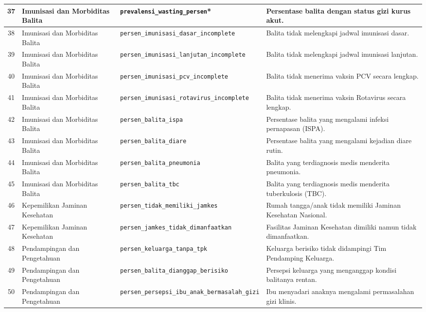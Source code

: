 \begin{longtable}{|c|p{}|p{}|p{}|}
    37 & Imunisasi dan Morbiditas Balita & \texttt{prevalensi\_\allowbreak wasting\_\allowbreak persen}* & Persentase balita dengan status gizi kurus akut. \tabularnewline \hline
    38 & Imunisasi dan Morbiditas Balita & \texttt{persen\_\allowbreak imunisasi\_\allowbreak dasar\_\allowbreak incomplete} & Balita tidak melengkapi jadwal imunisasi dasar. \tabularnewline \hline
    39 & Imunisasi dan Morbiditas Balita & \texttt{persen\_\allowbreak imunisasi\_\allowbreak lanjutan\_\allowbreak incomplete} & Balita tidak melengkapi jadwal imunisasi lanjutan. \tabularnewline \hline
    40 & Imunisasi dan Morbiditas Balita & \texttt{persen\_\allowbreak imunisasi\_\allowbreak pcv\_\allowbreak incomplete} & Balita tidak menerima vaksin PCV secara lengkap. \tabularnewline \hline
    41 & Imunisasi dan Morbiditas Balita & \texttt{persen\_\allowbreak imunisasi\_\allowbreak rotavirus\_\allowbreak incomplete} & Balita tidak menerima vaksin Rotavirus secara lengkap. \tabularnewline \hline
    42 & Imunisasi dan Morbiditas Balita & \texttt{persen\_\allowbreak balita\_\allowbreak ispa} & Persentase balita yang mengalami infeksi pernapasan (ISPA). \tabularnewline \hline
    43 & Imunisasi dan Morbiditas Balita & \texttt{persen\_\allowbreak balita\_\allowbreak diare} & Persentase balita yang mengalami kejadian diare rutin. \tabularnewline \hline
    44 & Imunisasi dan Morbiditas Balita & \texttt{persen\_\allowbreak balita\_\allowbreak pneumonia} & Balita yang terdiagnosis medis menderita pneumonia. \tabularnewline \hline
    45 & Imunisasi dan Morbiditas Balita & \texttt{persen\_\allowbreak balita\_\allowbreak tbc} & Balita yang terdiagnosis medis menderita tuberkulosis (TBC). \tabularnewline \hline
    46 & Kepemilikan Jaminan Kesehatan & \texttt{persen\_\allowbreak tidak\_\allowbreak memiliki\_\allowbreak jamkes} & Rumah tangga/anak tidak memiliki Jaminan Kesehatan Nasional. \tabularnewline \hline
    47 & Kepemilikan Jaminan Kesehatan & \texttt{persen\_\allowbreak jamkes\_\allowbreak tidak\_\allowbreak dimanfaatkan} & Fasilitas Jaminan Kesehatan dimiliki namun tidak dimanfaatkan. \tabularnewline \hline
    48 & Pendampingan dan Pengetahuan & \texttt{persen\_\allowbreak keluarga\_\allowbreak tanpa\_\allowbreak tpk} & Keluarga berisiko tidak didampingi Tim Pendamping Keluarga. \tabularnewline \hline
    49 & Pendampingan dan Pengetahuan & \texttt{persen\_\allowbreak balita\_\allowbreak dianggap\_\allowbreak berisiko} & Persepsi keluarga yang menganggap kondisi balitanya rentan. \tabularnewline \hline
    50 & Pendampingan dan Pengetahuan & \texttt{persen\_\allowbreak persepsi\_\allowbreak ibu\_\allowbreak anak\_\allowbreak bermasalah\_\allowbreak gizi} & Ibu menyadari anaknya mengalami permasalahan gizi klinis. \tabularnewline \hline

\end{longtable}
